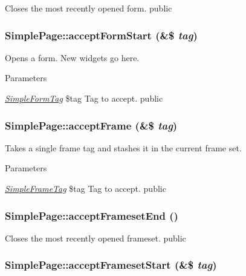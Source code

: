 \label{class_simple_page_a7804f4a25baf7c9e1ea5d67f6705b9f6}
Closes the most recently opened form.  public \hypertarget{class_simple_page_aa9e3e88104c4534ef345d9277b056993}{
\subsubsection[{acceptFormStart}]{\setlength{\rightskip}{0pt plus 5cm}SimplePage::acceptFormStart (\&\$ {\em tag})}}
\label{class_simple_page_aa9e3e88104c4534ef345d9277b056993}
Opens a form. New widgets go here. 
\begin{DoxyParams}{Parameters}
\item[{\em \hyperlink{class_simple_form_tag}{SimpleFormTag}}]\$tag Tag to accept.  public \end{DoxyParams}
\hypertarget{class_simple_page_a153aa5e3cb38fd9e79995e8d72e1d2ea}{
\subsubsection[{acceptFrame}]{\setlength{\rightskip}{0pt plus 5cm}SimplePage::acceptFrame (\&\$ {\em tag})}}
\label{class_simple_page_a153aa5e3cb38fd9e79995e8d72e1d2ea}
Takes a single frame tag and stashes it in the current frame set. 
\begin{DoxyParams}{Parameters}
\item[{\em \hyperlink{class_simple_frame_tag}{SimpleFrameTag}}]\$tag Tag to accept.  public \end{DoxyParams}
\hypertarget{class_simple_page_abbf865fd7f09eb6c5099ffd5e80934ca}{
\subsubsection[{acceptFramesetEnd}]{\setlength{\rightskip}{0pt plus 5cm}SimplePage::acceptFramesetEnd ()}}
\label{class_simple_page_abbf865fd7f09eb6c5099ffd5e80934ca}
Closes the most recently opened frameset.  public \hypertarget{class_simple_page_a6ba9a670edf6f3d4416930248da0bf2b}{
\subsubsection[{acceptFramesetStart}]{\setlength{\rightskip}{0pt plus 5cm}SimplePage::acceptFramesetStart (\&\$ {\em tag})}}
